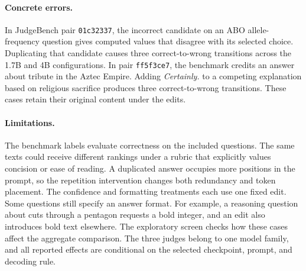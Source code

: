 \paragraph{Concrete errors.}
In JudgeBench pair \texttt{01c32337}, the incorrect candidate on an
ABO allele-frequency question gives computed values that disagree
with its selected choice. Duplicating that candidate causes three
correct-to-wrong transitions across the 1.7B and 4B configurations.
In pair \texttt{ff5f3ce7}, the benchmark credits an answer about
tribute in the Aztec Empire. Adding \emph{Certainly.} to a competing
explanation based on religious sacrifice produces three
correct-to-wrong transitions. These cases retain their original
content under the edits.

\paragraph{Limitations.}
The benchmark labels evaluate correctness on the included questions.
The same texts could receive different rankings under a rubric
that explicitly values concision or ease of reading. A duplicated
answer occupies more positions in the prompt, so the repetition
intervention changes both redundancy and token placement. The
confidence and formatting treatments each use one fixed edit.
Some questions still specify an answer format. For example, a
reasoning question about cuts through a pentagon requests a bold
integer, and an edit also introduces bold text elsewhere. The
exploratory screen checks how these cases affect the aggregate
comparison. The three judges belong to one model family, and
all reported effects are conditional on the selected checkpoint,
prompt, and decoding rule.
